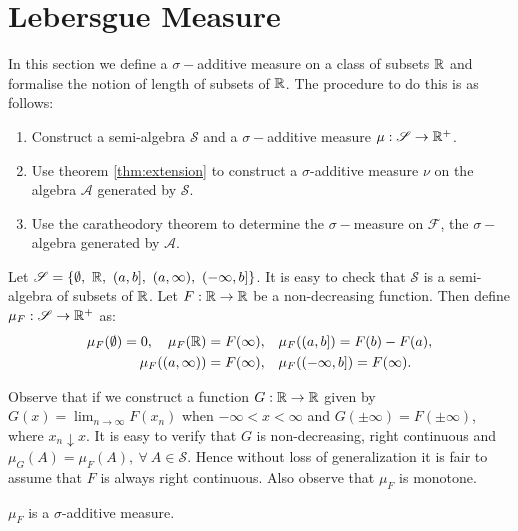 \section{Lebersgue Measure}
In this section we define a $\sigma-$additive measure on a class of subsets $\mathbb{R}$ and formalise the notion of length of subsets of $\mathbb{R}$. The procedure to do this is as follows:
\begin{enumerate}
  \item Construct a semi-algebra $ \mathscr{S}$ and a $\sigma-$additive measure $\mu: \mathscr{S}\to \mathbb{R}^+$.
  \item Use theorem \cref{thm:extension} to construct a $\sigma$-additive measure $\nu$ on the algebra $ \mathscr{A}$ generated by $ \mathscr{S}$.
  \item Use the caratheodory theorem to determine the $\sigma-$measure on $ \mathscr{F}$, the $\sigma-$algebra generated by $ \mathscr{A}$.
\end{enumerate}
\begin{definition}  
Let $ \mathscr{S} = \{ \emptyset,\ \R,\ (a,b],\ (a,\infty),\ (-\infty, b]\}$. It is easy to check that $ \mathscr{S}$ is a semi-algebra of subsets of $\mathbb{R}$. Let $F:\mathbb{R}\to\mathbb{R}$ be a non-decreasing function. Then define $\mu_F: \mathscr{S}\to \mathbb{R}^+$ as:
\begin{align*}
  \mu_F(\emptyset) = 0,\quad \mu_F(\mathbb{R})=F(\infty),\quad &\mu_F((a,b]) = F(b)-F(a), \\ \mu_F((a,\infty))=F(\infty),\quad &\mu_F((-\infty,b]) = F(\infty).
\end{align*}
\end{definition}
\begin{remark}
  Observe that if we construct a function $G:\mathbb{R}\to\mathbb{R}$ given by $G(x) = \lim_{n\to\infty} F(x_n)$ when $-\infty<x<\infty$ and $G(\pm \infty) = F(\pm \infty)$, where $x_n \downarrow x$. It is easy to verify that $G$ is non-decreasing, right continuous and $\mu_G(A) = \mu_F(A),\ \forall\ A \in \mathscr{S}$. Hence without loss of generalization it is fair to assume that $F$ is always right continuous. Also observe that $\mu_F$ is monotone. 
\end{remark}
\begin{proposition}
  $\mu_F$ is a $\sigma$-additive measure. 
\end{proposition}
